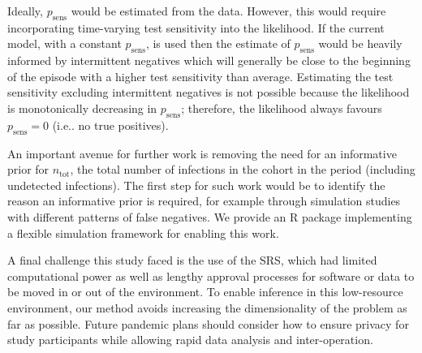 \documentclass[12pt]{article}
\makeatletter
\newcommand{\psens}{p_\text{sens}}
\newcommand{\ntot}{n_\text{tot}}
\DeclareRobustCommand\onedot{\futurelet\@let@token\@onedot}
\def\@onedot{\ifx\@let@token.\else.\null\fi\xspace}
\def\ie{i.e\onedot} \def\Ie{{I.e}\onedot}
\makeatother
\begin{document}
Ideally, $\psens$ would be estimated from the data.
However, this would require incorporating time-varying test sensitivity into the likelihood.
If the current model, with a constant $\psens$, is used then the estimate of $\psens$ would be heavily informed by intermittent negatives which will generally be close to the beginning of the episode with a higher test sensitivity than average.
Estimating the test sensitivity excluding intermittent negatives is not possible because the likelihood is monotonically decreasing in $\psens$; therefore, the likelihood always favours $\psens = 0$ (\ie no true positives).

An important avenue for further work is removing the need for an informative prior for $\ntot$, the total number of infections in the cohort in the period (including undetected infections).
The first step for such work would be to identify the reason an informative prior is required, for example through simulation studies with different patterns of false negatives.
We provide an R package implementing a flexible simulation framework for enabling this work.

A final challenge this study faced is the use of the SRS, which had limited computational power as well as lengthy approval processes for software or data to be moved in or out of the environment.
To enable inference in this low-resource environment, our method avoids increasing the dimensionality of the problem as far as possible.
Future pandemic plans should consider how to ensure privacy for study participants while allowing rapid data analysis and inter-operation.

\end{document}
